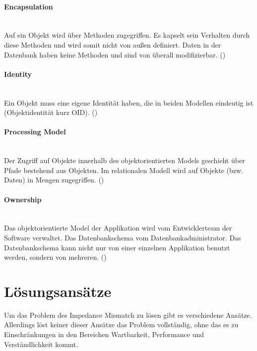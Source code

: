 \paragraph{Encapsulation} \hspace{0pt} \\
Auf ein Objekt wird über Methoden zugegriffen. Es kapselt sein Verhalten durch diese Methoden und wird somit nicht von außen definiert. Daten in der Datenbank haben keine Methoden und sind von überall modifizierbar.  (\cite[S. 4]{Sche1})

\paragraph{Identity} \hspace{0pt} \\
Ein Objekt muss eine eigene Identität haben, die in beiden Modellen eindeutig ist (Objektidentität kurz OID).  (\cite[S. 4]{Sche1})

\paragraph{Processing Model} \hspace{0pt} \\
Der Zugriff auf Objekte innerhalb des objektorientierten Models geschieht über Pfade bestehend aus Objekten. Im relationalen Modell wird auf Objekte (bzw. Daten) in Mengen zugegriffen.  (\cite[S. 4]{Sche1})

\paragraph{Ownership} \hspace{0pt} \\
Das objektorientierte Model der Applikation wird vom Entwicklerteam der Software verwaltet. Das Datenbankschema vom Datenbankadministrator. Das Datenbankschema kann nicht nur von einer einzelnen Applikation benutzt werden, sondern von mehreren.  (\cite[S. 4]{Sche1})

\section{Lösungsansätze}

Um das Problem des Impedance Mismatch zu lösen gibt es verschiedene Ansätze. Allerdings löst keiner dieser Ansätze das Problem vollständig, ohne das es zu Einschränkungen in den Bereichen Wartbarkeit, Performance und Verständlichkeit kommt.

